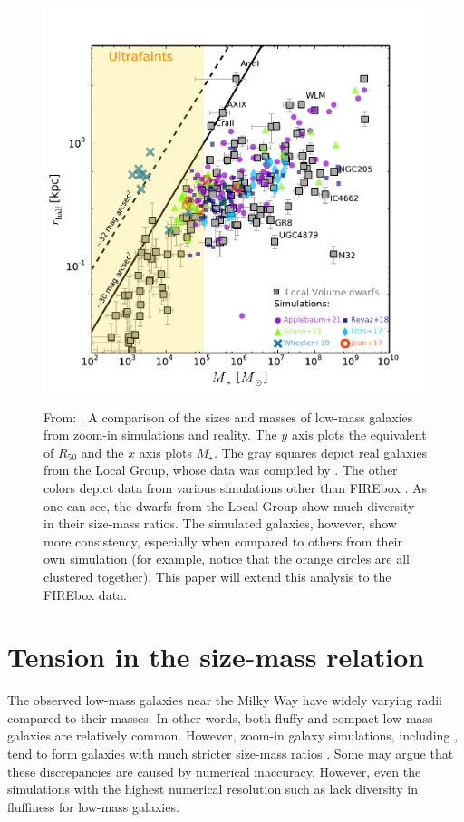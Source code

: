 \begin{figure}
    \centering
    \includegraphics*[width=\textwidth*2/3]{figs/sales/fig4.pdf}
    \label{fig:sales-size-mass}
    \caption{
        From: \cite{salesBaryonicSolutionsChallenges2022}. A comparison of the sizes and masses of low-mass galaxies from zoom-in simulations and reality. The $y$ axis plots the equivalent of $R_{50}$ and the $x$ axis plots $M_\star$. The gray squares depict real galaxies from the Local Group, whose data was compiled by \cite{mcconnachieOBSERVEDPROPERTIESDWARF2012}. The other colors depict data from various simulations other than FIREbox \citep[refer to][]{salesBaryonicSolutionsChallenges2022}. As one can see, the dwarfs from the Local Group show much diversity in their size-mass ratios. The simulated galaxies, however, show more consistency, especially when compared to others from their own simulation (for example, notice that the orange circles are all clustered together). This paper will extend this analysis to the FIREbox data.
    }
\end{figure}


\section{Tension in the size-mass relation}

The observed low-mass galaxies near the Milky Way have widely varying radii compared to their masses. In other words, both fluffy and compact low-mass galaxies are relatively common. However, zoom-in galaxy simulations, including \cite{fittsFireFieldSimulating2017}, tend to form galaxies with much stricter size-mass ratios \citep{salesBaryonicSolutionsChallenges2022}. Some may argue that these discrepancies are caused by numerical inaccuracy. However, even the simulations with the highest numerical resolution such as \cite{wheelerBeItTherefore2019} lack diversity in fluffiness for low-mass galaxies. 

